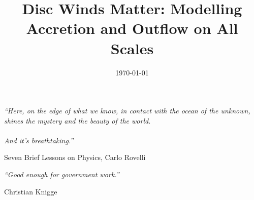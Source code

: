 \documentclass[a4paper, 11pt, twoside]{Thesis}  %
\begin{document}
\frontmatter      %

\title  {Disc Winds Matter: Modelling Accretion and Outflow on All Scales}
\addresses  {\groupname\\\deptname\\\univname}  %
\date       {\today}
\subject    {}
\keywords   {}

\maketitle


\fancyhead{}  %
\rhead{\thepage}  %
\lhead{}  %

\pagestyle{fancy}  %

\pagestyle{empty}  %

\null\vfill
\textit{``Here, on the edge of what we know, in contact with the ocean of the unknown, shines the mystery and the beauty of the world.\\\\And it's breathtaking.''}

\begin{flushright}
Seven Brief Lessons on Physics, Carlo Rovelli
\end{flushright}

\textit{``Good enough for government work.''}

\begin{flushright}
Christian Knigge
\end{flushright}

\vfill\vfill\vfill\vfill\vfill\vfill\null
\end{document}
